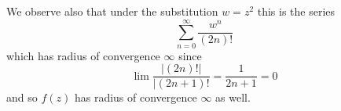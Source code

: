 \documentclass{article}
\begin{document}

We observe also that under the substitution $w = z^2$ this is
the series
$$
\sum_{n=0}^{\infty} \frac{w^n}{(2n)!}
$$
which has radius of convergence $\infty$ since
$$
\lim \frac{|(2n)!|}{|(2n+1)!} = \frac{1}{2n+1} = 0
$$
and so $f(z)$ has radius of convergence $\infty$ as well.
\end{document}
